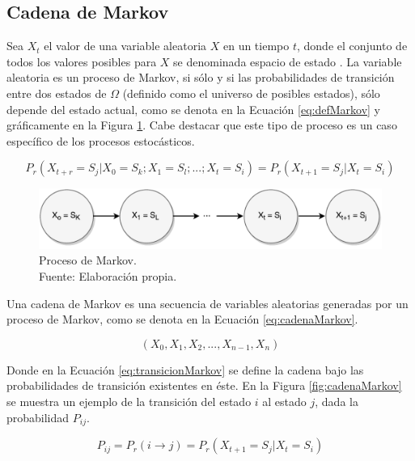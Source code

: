 \subsection{Cadena de Markov}
\label{subsec:cadenaMarkov}

Sea $X_t$ el valor de una variable aleatoria $X$ en un tiempo $t$, donde el conjunto de todos los valores posibles para $X$ se denominada espacio de estado \citep{ching2006markov}. La variable aleatoria es un proceso de Markov, si s\'olo y si las probabilidades de transici\'on entre dos estados de $\Omega$ (definido como el universo de posibles estados), s\'olo depende del estado actual, como se denota en la Ecuaci\'on \ref{eq:defMarkov} y gr\'aficamente en la Figura \ref{fig:procesoMarkov}. Cabe destacar que este tipo de proceso es un caso espec\'ifico de los procesos estoc\'asticos.

\begin{equation} \label{eq:defMarkov} 
	P_r(X_{t+r} = S_j | X_0 = S_k ; X_1 = S_l ; ... ; X_t = S_i) = P_r(X_{t+1} = S_j | X_t = S_i)
\end{equation}

\begin{figure}[ht!]
  \centering
    \includegraphics[scale=0.6]{images/ProcesoMarkov.pdf}
  \caption[Proceso de Markov.]{Proceso de Markov.\\Fuente: Elaboración propia.}
  \label{fig:procesoMarkov}
\end{figure}

Una cadena de Markov es una secuencia de variables aleatorias generadas por un proceso de Markov, como se denota en la Ecuaci\'on \ref{eq:cadenaMarkov}.

\begin{equation} \label{eq:cadenaMarkov}
	(X_0, X_1, X_2, ..., X_{n-1}, X_{n})
\end{equation}

\normalsize{Donde en la Ecuaci\'on} \ref{eq:transicionMarkov} \normalsize{se define la cadena bajo las probabilidades de transici\'on existentes en \'este.} En la Figura \ref{fig:cadenaMarkov} se muestra un ejemplo de la transici\'on del estado $i$ al estado $j$, dada la probabilidad $P_{ij}$.

\begin{equation} \label{eq:transicionMarkov}
	P_{ij} = P_r(i \rightarrow j) = P_r(X_{t+1} = S_j | X_t = S_i)
\end{equation}

